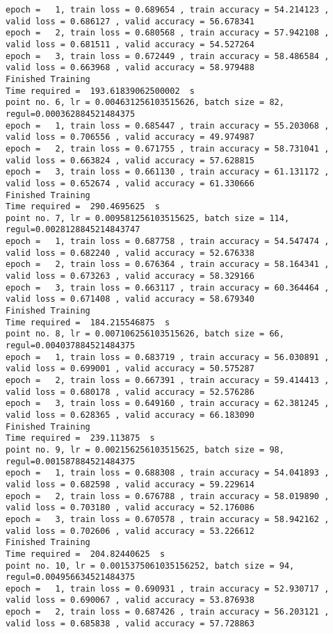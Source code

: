 \documentclass[11pt]{article}
\begin{document}
\begin{Verbatim}[commandchars=\\\{\}]
epoch =   1, train loss = 0.689654 , train accuracy = 54.214123 , valid loss = 0.686127 , valid accuracy = 56.678341
epoch =   2, train loss = 0.680568 , train accuracy = 57.942108 , valid loss = 0.681511 , valid accuracy = 54.527264
epoch =   3, train loss = 0.672449 , train accuracy = 58.486584 , valid loss = 0.663968 , valid accuracy = 58.979488
Finished Training
Time required =  193.61839062500002  s 
point no. 6, lr = 0.004631256103515626, batch size = 82, regul=0.000362884521484375
epoch =   1, train loss = 0.685447 , train accuracy = 55.203068 , valid loss = 0.706556 , valid accuracy = 49.974987
epoch =   2, train loss = 0.671755 , train accuracy = 58.731041 , valid loss = 0.663824 , valid accuracy = 57.628815
epoch =   3, train loss = 0.661130 , train accuracy = 61.131172 , valid loss = 0.652674 , valid accuracy = 61.330666
Finished Training
Time required =  290.4695625  s 
point no. 7, lr = 0.009581256103515625, batch size = 114, regul=0.0028128845214843747
epoch =   1, train loss = 0.687758 , train accuracy = 54.547474 , valid loss = 0.682240 , valid accuracy = 52.676338
epoch =   2, train loss = 0.676364 , train accuracy = 58.164341 , valid loss = 0.673263 , valid accuracy = 58.329166
epoch =   3, train loss = 0.663117 , train accuracy = 60.364464 , valid loss = 0.671408 , valid accuracy = 58.679340
Finished Training
Time required =  184.215546875  s 
point no. 8, lr = 0.007106256103515626, batch size = 66, regul=0.004037884521484375
epoch =   1, train loss = 0.683719 , train accuracy = 56.030891 , valid loss = 0.699001 , valid accuracy = 50.575287
epoch =   2, train loss = 0.667391 , train accuracy = 59.414413 , valid loss = 0.680178 , valid accuracy = 52.576286
epoch =   3, train loss = 0.649160 , train accuracy = 62.381245 , valid loss = 0.628365 , valid accuracy = 66.183090
Finished Training
Time required =  239.113875  s 
point no. 9, lr = 0.002156256103515625, batch size = 98, regul=0.001587884521484375
epoch =   1, train loss = 0.688308 , train accuracy = 54.041893 , valid loss = 0.682598 , valid accuracy = 59.229614
epoch =   2, train loss = 0.676788 , train accuracy = 58.019890 , valid loss = 0.703180 , valid accuracy = 52.176086
epoch =   3, train loss = 0.670578 , train accuracy = 58.942162 , valid loss = 0.702606 , valid accuracy = 53.226612
Finished Training
Time required =  204.82440625  s 
point no. 10, lr = 0.0015375061035156252, batch size = 94, regul=0.004956634521484375
epoch =   1, train loss = 0.690931 , train accuracy = 52.930717 , valid loss = 0.690067 , valid accuracy = 53.876938
epoch =   2, train loss = 0.687426 , train accuracy = 56.203121 , valid loss = 0.685838 , valid accuracy = 57.728863

\end{Verbatim}
\end{document}
